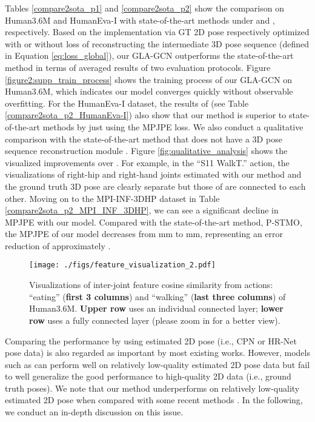 \documentclass[10pt,twocolumn,letterpaper]{article}
\begin{document}
Tables \ref{compare2sota_p1} and \ref{compare2sota_p2} show the comparison on Human3.6M and HumanEva-I with state-of-the-art methods under  and , respectively. Based on the implementation via GT 2D pose respectively optimized with or without loss of reconstructing the intermediate 3D pose sequence (defined in Equation \ref{eq:loss_global}), our GLA-GCN outperforms the state-of-the-art method \cite{zhang2022mixste} in terms of averaged results of two evaluation protocols. Figure \ref{figure2:supp_train_process} shows the training process of our GLA-GCN on Human3.6M, which indicates our model converges
quickly without observable overfitting.
For the HumanEva-I dataset, the results of  (see Table \ref{compare2sota_p2_HumanEva-I}) also show that our method is superior to state-of-the-art methods by just using the MPJPE loss.  
We also conduct a qualitative comparison with the state-of-the-art method that does not have a 3D pose sequence reconstruction module \cite{RN013}. Figure \ref{fig:qualitative_analysis} shows the visualized improvements over \cite{RN013}. 
For example, in the “S11 WalkT.” action, the visualizations of right-hip and right-hand joints estimated with our method and the ground truth 3D pose are clearly separate but those of \cite{RN013} are connected to each other. Moving on to the MPI-INF-3DHP dataset in Table \ref{compare2sota_p2_MPI_INF_3DHP}, we can see a significant decline in MPJPE with our model. 
Compared with the state-of-the-art method, P-STMO\cite{shan2022p}, the MPJPE of our model decreases from mm to mm, representing an error reduction of approximately .

\begin{figure*}[h]
	\begin{center}
		\texttt{[image: ./figs/feature\_visualization\_2.pdf]}
	\end{center}
	\vspace{-8pt}
	\caption{Visualizations of inter-joint feature cosine similarity from actions: ``eating'' (\textbf{first 3 columns}) and ``walking'' (\textbf{last three columns}) of Human3.6M. \textbf{Upper row} uses an individual connected layer; \textbf{lower row} uses a fully connected layer (please zoom in for a better view). }
	\label{fig:feature_visualization}
 \vspace{-6pt}
\end{figure*}

Comparing the performance by using estimated 2D pose (i.e., CPN or HR-Net pose data) is also regarded as important by most existing works. However, models such as \cite{li2022mhformer,shan2022p} can perform well on relatively low-quality estimated 2D pose data but fail to well generalize the good performance to high-quality 2D data (i.e., ground truth poses). We note that our method underperforms on relatively low-quality estimated 2D pose when compared with some recent methods \cite{li2022mhformer, shan2022p, zhang2022mixste}. In the following, we conduct an in-depth discussion on this issue.
\end{document}
